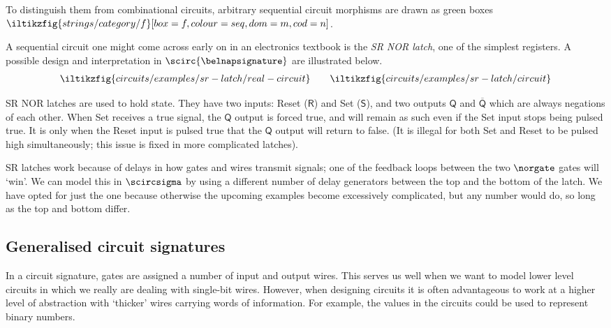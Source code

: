 \documentclass{lmcs}
\begin{document}
To distinguish them from combinational circuits, arbitrary sequential circuit
morphisms are drawn as green boxes \(
\iltikzfig{strings/category/f}[box=f,colour=seq,dom=m,cod=n]
\).

\begin{exa}[SR latch]\label{ex:sr-latch}
    A sequential circuit one might come across early on in an electronics
    textbook is the \emph{SR NOR latch}, one of the simplest registers.
    A possible design and interpretation in \(\scirc{\belnapsignature}\) are
    illustrated below.
    \begin{gather*}
        \iltikzfig{circuits/examples/sr-latch/real-circuit}
        \qquad
        \iltikzfig{circuits/examples/sr-latch/circuit}
    \end{gather*}

    SR NOR latches are used to hold state.
    They have two inputs: Reset (\(\mathsf{R}\)) and Set (\(\mathsf{S}\)), and
    two outputs \(\mathsf{Q}\) and \(\overline{\mathsf{Q}}\) which are always
    negations of each other.
    When Set receives a true signal, the \(\mathsf{Q}\) output is forced true,
    and will remain as such even if the Set input stops being pulsed true.
    It is only when the Reset input is pulsed true that the \(\mathsf{Q}\)
    output will return to false.
    (It is illegal for both Set and Reset to be pulsed high simultaneously; this
    issue is fixed in more complicated latches).

    SR latches work because of delays in how gates and wires transmit signals;
    one of the feedback loops between the two \(\norgate\) gates will `win'.
    We can model this in \(\scircsigma\) by using a different number of delay
    generators between the top and the bottom of the latch.
    We have opted for just the one because otherwise the upcoming examples
    become excessively complicated, but any number would do, so long as the top
    and bottom differ.
\end{exa}

\subsection{Generalised circuit signatures}

In a circuit signature, gates are assigned a number of input and output wires.
This serves us well when we want to model lower level circuits in which we
really are dealing with single-bit wires.
However, when designing circuits it is often advantageous to work at a higher
level of abstraction with `thicker' wires carrying words of information.
For example, the values in the circuits could be used to represent binary
numbers.
\end{document}
